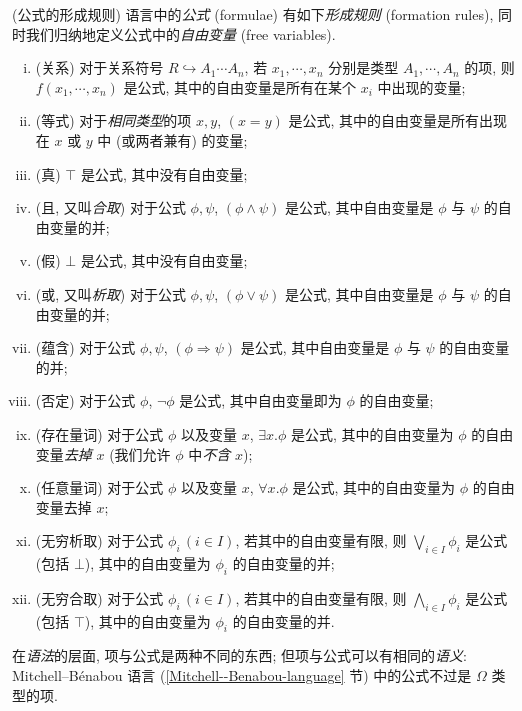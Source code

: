 \begin{definition}
	[label={formula}]
	{(公式的形成规则)}
	语言中的\emph{公式} (formulae) 有如下\emph{形成规则} (formation rules), 同时我们归纳地定义公式中的\emph{自由变量} (free variables).
	\begin{enumerate}[(i)]
		\item (关系) 对于关系符号 $R \hookrightarrow A_1\cdots A_n$, 若 $x_1,\cdots,x_n$ 分别是类型 $A_1,\cdots,A_n$ 的项, 则 $f(x_1,\cdots,x_n)$ 是公式, 其中的自由变量是所有在某个 $x_i$ 中出现的变量;
		\item (等式) 对于\emph{相同类型}的项 $x,y$, $(x=y)$ 是公式, 其中的自由变量是所有出现在 $x$ 或 $y$ 中 (或两者兼有) 的变量;
		\item (真) $\top$ 是公式, 其中没有自由变量;
		\item (且, 又叫\emph{合取}) 对于公式 $\phi,\psi$, $(\phi\wedge\psi)$ 是公式, 其中自由变量是 $\phi$ 与 $\psi$ 的自由变量的并;
		\item (假) $\bot$ 是公式, 其中没有自由变量;
		\item (或, 又叫\emph{析取}) 对于公式 $\phi,\psi$, $(\phi\vee\psi)$ 是公式, 其中自由变量是 $\phi$ 与 $\psi$ 的自由变量的并;
		\item (蕴含) 对于公式 $\phi,\psi$, $(\phi\Rightarrow \psi)$ 是公式, 其中自由变量是 $\phi$ 与 $\psi$ 的自由变量的并;
		\item (否定) 对于公式 $\phi$, $\neg\phi$ 是公式, 其中自由变量即为 $\phi$ 的自由变量;
		\item (存在量词) 对于公式 $\phi$ 以及变量 $x$, $\exists x.\phi$ 是公式, 其中的自由变量为 $\phi$ 的自由变量\emph{去掉} $x$ (我们允许 $\phi$ 中\emph{不含} $x$);
		\item (任意量词) 对于公式 $\phi$ 以及变量 $x$, $\forall x.\phi$ 是公式, 其中的自由变量为 $\phi$ 的自由变量去掉 $x$;
		\item (无穷析取) 对于公式 $\phi_i\, (i\in I)$, 若其中的自由变量有限, 则 $\bigvee_{i\in I}\phi_i$ 是公式 (包括 $\bot$), 其中的自由变量为 $\phi_i$ 的自由变量的并;
		\item (无穷合取) 对于公式 $\phi_i\, (i\in I)$, 若其中的自由变量有限, 则 $\bigwedge_{i\in I}\phi_i$ 是公式 (包括 $\top$), 其中的自由变量为 $\phi_i$ 的自由变量的并.
	\end{enumerate}
\end{definition}

\begin{remark}
	{}
	在\emph{语法}的层面, 项与公式是两种不同的东西; 但项与公式可以有相同的\emph{语义}: Mitchell--B\'enabou 语言 (\ref{Mitchell--Benabou-language} 节) 中的公式不过是 $\Omega$ 类型的项.
\end{remark}



